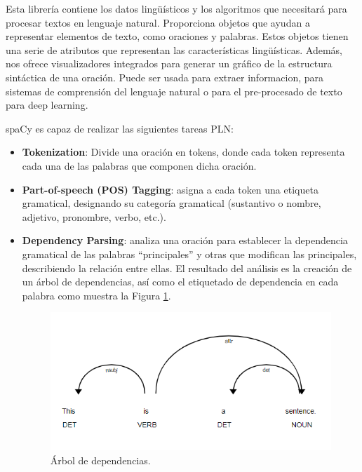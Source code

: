 Esta librería contiene los datos lingüísticos y los algoritmos que necesitará para procesar textos en lenguaje natural. Proporciona objetos que ayudan a representar elementos de texto, como oraciones y palabras. Estos objetos tienen una serie de atributos que representan las características lingüísticas. Además, nos ofrece visualizadores integrados para generar un gráfico de la estructura sintáctica de una oración. Puede ser usada para extraer informacion, para sistemas de comprensión del lenguaje natural o para el pre-procesado de texto para deep learning.

spaCy es capaz de realizar las siguientes tareas PLN:

\begin{itemize}
	\item \textbf{Tokenization}: Divide una oración en tokens, donde cada token	representa cada una de las palabras que componen dicha oración.
	\item \textbf{Part-of-speech (POS) Tagging}: asigna a cada token una etiqueta gramatical, designando su categoría gramatical (sustantivo o nombre, adjetivo, pronombre, verbo, etc.).
	\item \textbf{Dependency Parsing}: analiza una oración para establecer la dependencia gramatical de las palabras ``principales'' y otras que modifican las principales, describiendo la relación entre ellas. El resultado del análisis es la creación de un árbol de dependencias, así como el etiquetado de dependencia en cada palabra como muestra la Figura \ref{fig:dependeciaSpacy}. 
	\begin{figure}[h!]
		\centering
		
		
		\includegraphics[scale=1]{Imagenes/Figuras/dependenciaSpacy}
		
		
		\caption{Árbol de dependencias.}
		\label{fig:dependeciaSpacy}
	\end{figure}
	

\end{itemize}
